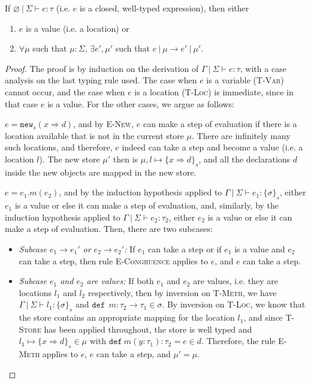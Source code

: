 \documentclass{llncs}
\newcommand{\keywadj}[1]{\mathtt{#1}}
\newcommand{\keyw}[1]{\keywadj{#1}~}
\newcommand{\pcase}[1][]{
  \if\relax\detokenize{#1}\relax
    \def\thiscase{}
  \else
    \def\thiscase{~#1}
  \fi
  \item
}
\begin{document}
\begin{theorem}[Progress]
If $\varnothing~|~\Sigma \vdash e : \tau$ (i.e. $e$ is a closed, well-typed expression), then either
\begin{enumerate}
\item $e$ is a value (i.e. a location) or
\item $\forall \mu$ such that $\mu : \Sigma$,
   $\exists e', \mu'$ such that $e~|~\mu \longrightarrow e'~|~\mu'$.
\end{enumerate}
\end{theorem}
\begin{proof} The proof is by induction on the derivation of $\Gamma~|~\Sigma \vdash e : \tau$, with a case analysis on the last typing rule used. The case when $e$ is a variable (\textsc{T-Var}) cannot occur, and the case when $e$ is a location (\textsc{T-Loc}) is immediate, since in that case $e$ is a value. For the other cases, we argue as follows:

\begin{pcases}
\pcase[\textsc{T-New}]
$e = \keywadj{new}_{s}(x \Rightarrow d)$, and by \textsc{E-New}, $e$ can make a step of evaluation if there is a location available that is not in the current store $\mu$. There are infinitely many such locations, and therefore, $e$ indeed can take a step and become a value (i.e. a location $l$). The new store $\mu'$ then is $\mu, l \mapsto \{ x \Rightarrow d \}_{s}$, and all the declarations $d$ inside the new objects are mapped in the new store.
\\
\pcase[\textsc{T-Meth}]
$e = e_1.m(e_2)$, and by the induction hypothesis applied to $\Gamma~|~\Sigma \vdash e_1 : \{\sigma\}_s$, either $e_1$ is a value or else it can make a step of evaluation, and, similarly, by the induction hypothesis applied to $\Gamma~|~\Sigma \vdash e_2 : \tau_2$, either $e_2$ is a value or else it can make a step of evaluation. Then, there are two subcases:
\\
\begin{itemize}
\item[]  \textit{Subcase $e_1 \longrightarrow e_1'$ or $e_2 \longrightarrow e_2'$:} If $e_1$ can take a step or if $e_1$ is a value and $e_2$ can take a step, then rule \textsc{E-Congruence} applies to $e$, and $e$ can take a step.
\\
\item[]  \textit{Subcase $e_1$ and $e_2$ are values:} If both $e_1$ and $e_2$ are values, i.e. they are locations $l_1$ and $l_2$ respectively, then by inversion on \textsc{T-Meth}, we have $\Gamma~|~\Sigma \vdash l_1 : \{\sigma\}_s$ and $\keyw{def}~ m : \tau_2 \rightarrow \tau_1 \in \sigma$. By inversion on \textsc{T-Loc}, we know that the store contains an appropriate mapping for the location $l_1$, and since \textsc{T-Store} has been applied throughout, the store is well typed and $l_1 \mapsto \{ x \Rightarrow d \}_{s} \in \mu$ with $\keyw{def} m(y : \tau_1) : \tau_2 = e \in d$. Therefore, the rule \textsc{E-Meth} applies to $e$, $e$ can take a step, and $\mu' = \mu$.
\\
\end{itemize}


\end{pcases}
\end{proof}
\end{document}
